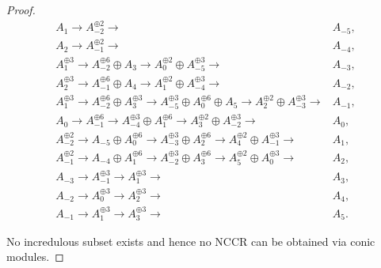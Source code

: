 \documentclass[10pt,a4paper]{amsart}
\begin{document}
\begin{proof}
    \begin{align*}
        A_{1}\longrightarrow A_{-2}^{\oplus 2}\longrightarrow & A_{-5},\\
        A_2\longrightarrow A_{-1}^{\oplus 2}\longrightarrow & A_{-4},\\
        A_1^{\oplus 3}\longrightarrow A_{-2}^{\oplus 6}\oplus A_3\longrightarrow A_0^{\oplus 2}\oplus A_{-5}^{\oplus 3}\longrightarrow & A_{-3},\\
        A_2^{\oplus 3}\longrightarrow A_{-1}^{\oplus 6}\oplus A_4\longrightarrow A_1^{\oplus 2}\oplus A_{-4}^{\oplus 3}\longrightarrow & A_{-2},\\
        A_1^{\oplus 3}\longrightarrow A_{-2}^{\oplus 6}\oplus A_3^{\oplus 3}\longrightarrow A_{-5}^{\oplus 3}\oplus A_0^{\oplus 6}\oplus A_5\longrightarrow A_2^{\oplus 2}\oplus A_{-3}^{\oplus 3}\longrightarrow & A_{-1},\\
        A_0\longrightarrow A_{-1}^{\oplus 6}\longrightarrow A_{-4}^{\oplus 3}\oplus A_1^{\oplus 6}\longrightarrow A_3^{\oplus 2}\oplus A_{-2}^{\oplus 3}\longrightarrow & A_0,\\
        A_{-2}^{\oplus 2}\longrightarrow A_{-5}\oplus A_0^{\oplus 6}\longrightarrow A_{-3}^{\oplus 3}\oplus A_2^{\oplus 6}\longrightarrow A_4^{\oplus 2}\oplus A_{-1}^{\oplus3}\longrightarrow & A_1,\\
        A_{-1}^{\oplus 2}\longrightarrow A_{-4}\oplus A_1^{\oplus 6}\longrightarrow A_{-2}^{\oplus 3}\oplus A_3^{\oplus 6}\longrightarrow A_5^{\oplus 2}\oplus A_0^{\oplus 3}\longrightarrow & A_2,\\
        A_{-3}\longrightarrow A_{-1}^{\oplus 3}\longrightarrow A_1^{\oplus 3}\longrightarrow & A_3,\\
        A_{-2}\longrightarrow A_0^{\oplus 3}\longrightarrow A_2^{\oplus 3}\longrightarrow & A_4,\\
        A_{-1}\longrightarrow A_1^{\oplus 3}\longrightarrow A_3^{\oplus 3}\longrightarrow & A_5.
    \end{align*}


    No incredulous subset exists and hence no NCCR can be obtained via conic modules.
    

\end{proof}
\end{document}
